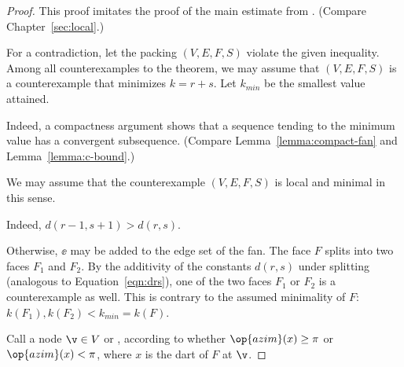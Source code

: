 \begin{proof} This proof imitates the proof of the main estimate from
  \cite{Hales:2006:DCG}.   (Compare
  Chapter~\ref{sec:local}.)

  For a contradiction, let the packing $(V,E,F,S)$ violate the given
  inequality.  Among all counterexamples to the theorem, we may assume
  that $(V,E,F,S)$ is a counterexample that minimizes $k=r+s$.  Let
  $k_{min}$ be the smallest value attained.



    Indeed, a compactness argument shows that a sequence
tending to the minimum value has a convergent subsequence.  (Compare
Lemma~\ref{lemma:compact-fan} and Lemma~\ref{lemma:c-bound}.)

We may assume that the counterexample $(V,E,F,S)$ is local and minimal
in this sense.

  Indeed, $d(r-1,s+1)>d(r,s)$.

  Otherwise, $\ee$ may be added to the edge
set of the fan.  The face $F$ splits into two faces $F_1$ and $F_2$.
By the additivity of the constants $d(r,s)$ under splitting (analogous
to Equation~\ref{eqn:drs}), one of the two faces $F_1$ or $F_2$ is a
counterexample as well.  This is contrary to the assumed minimality of
$F$: $k(F_1),k(F_2)<k_{min}=k(F)$.


Call a node $\v\in V$  or , according
to whether $\op{azim}(x)\ge\pi$ or $\op{azim}(x)<\pi$, where $x$ is
the dart of $F$ at $\v$.  %
%


\end{proof}
